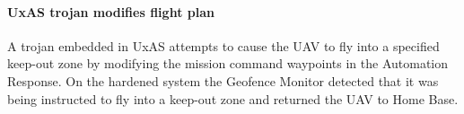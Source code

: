 \paragraph{UxAS trojan modifies flight plan} A trojan embedded in UxAS attempts to cause the UAV to fly into a specified keep-out zone by modifying the mission command waypoints in the Automation Response.
On the hardened system the Geofence Monitor detected that it was being instructed to fly into a keep-out zone and returned the UAV to Home Base.


